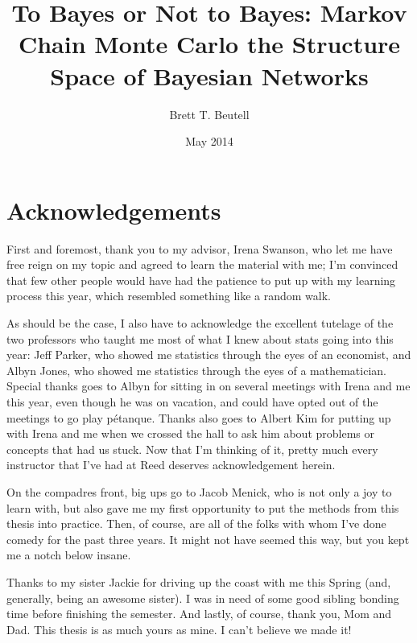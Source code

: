 \documentclass[12pt,twoside]{reedthesis}
\title{To Bayes or Not to Bayes: Markov Chain Monte Carlo  the Structure Space of Bayesian Networks}
\author{Brett T. Beutell}
\date{May 2014}
\begin{document}
  \maketitle
  \frontmatter %
  \pagestyle{empty} %

    \chapter*{Acknowledgements}
	First and foremost, thank you to my advisor, Irena Swanson, who let me have free reign on my topic and agreed to learn the material with me; 
	I'm convinced that few other people would have had the patience to put up with my learning process this year, which resembled something like a random walk. 
	
	As should be the case, I also have to acknowledge the excellent tutelage of the two professors who taught me most of what I knew about stats going into this year: Jeff Parker, who showed me statistics through the eyes of an economist, and Albyn Jones, who showed me statistics through the eyes of a mathematician. 
	Special thanks goes to Albyn for sitting in on several meetings with Irena and me this year, even though he was on vacation, and could have opted out of the meetings to go play p\'{e}tanque. 
	Thanks also goes to Albert Kim for putting up with Irena and me when we crossed the hall to ask him about problems or concepts that had us stuck. 
	Now that I'm thinking of it, pretty much every instructor that I've had at Reed deserves acknowledgement herein. 

	On the compadres front, big ups go to Jacob Menick, who is not only a joy to learn with, but also gave me my first opportunity to put the methods from this thesis into practice. Then, of course, are all of the folks with whom I've done comedy for the past three years. It might not have seemed this way, but you kept me a notch below insane. 
	
	Thanks to my sister Jackie for driving up the coast with me this Spring (and, generally, being an awesome sister). I was in need of some good sibling bonding time before finishing the semester. And lastly, of course, thank you, Mom and Dad. This thesis is as much yours as mine. I can't believe we made it!
	
	
	

\end{document}
